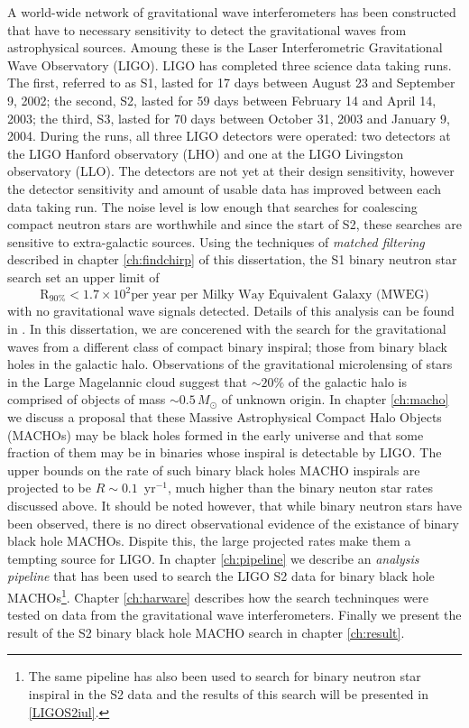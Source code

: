 A world-wide network of gravitational wave interferometers has been
constructed that have to necessary sensitivity to detect the gravitational
waves from astrophysical sources. Amoung these is the Laser Interferometric
Gravitational Wave Observatory (LIGO)\cite{Barish:1999}. LIGO has completed
three science data taking runs. The first, referred to as S1, lasted for 17
days between August 23 and September 9, 2002\cite{abbott2003a}; the second,
S2, lasted for 59 days between February 14 and April 14, 2003; the third, S3,
lasted for 70 days between October 31, 2003 and January 9, 2004.  During the
runs, all three LIGO detectors were operated: two detectors at the LIGO
Hanford observatory (LHO) and one at the LIGO Livingston observatory (LLO).
The detectors are not yet at their design sensitivity, however the detector
sensitivity and amount of usable data has improved between each data taking
run. The noise level is low enough that searches for coalescing compact
neutron stars are worthwhile and since the start of S2, these searches are
sensitive to extra-galactic sources. Using the techniques of \emph{matched
filtering} described in chapter \ref{ch:findchirp} of this dissertation, the
S1 binary neutron star search set an upper limit of
\begin{equation}
\mathrm{R}_{90\%} < 1.7 \times 10^2 \textrm{per year per Milky Way Equivalent Galaxy (MWEG)}
\end{equation}
with no gravitational wave signals detected. Details of this analysis can be
found in \cite{abbott2003b}. In this dissertation, we are concerened with the
search for the gravitational waves from a different class of compact binary
inspiral; those from binary black holes in the galactic halo. Observations of
the gravitational microlensing of stars in the Large Magelannic cloud suggest
that $\sim 20\%$ of the galactic halo is comprised of objects of mass $\sim
0.5\,M_\odot$ of unknown origin. In chapter \ref{ch:macho} we discuss a
proposal that these Massive Astrophysical Compact Halo Objects (MACHOs) may be
black holes formed in the early universe and that some fraction of them may be
in binaries whose inspiral is detectable by LIGO\cite{Nakamura:1997sm}.  The
upper bounds on the rate of such binary black holes MACHO inspirals are
projected to be $R \sim 0.1$~yr$^{-1}$, much higher than the binary neuton
star rates discussed above. It should be noted however, that while binary
neutron stars have been observed, there is no direct observational evidence of
the existance of binary black hole MACHOs. Dispite this, the large projected
rates make them a tempting source for LIGO. In chapter \ref{ch:pipeline} we
describe an \emph{analysis pipeline} that has been used to search the LIGO S2
data for binary black hole MACHOs\footnote{The same pipeline has also been
used to search for binary neutron star inspiral in the S2 data and the results
of this search will be presented in \ref{LIGOS2iul}.}. Chapter
\ref{ch:harware} describes how the search techninques were tested on data from
the gravitational wave interferometers. Finally we present the result of the
S2 binary black hole MACHO search in chapter \ref{ch:result}. 

